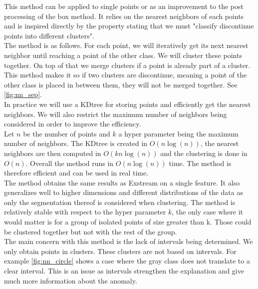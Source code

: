 \documentclass[oneside, a4paper, onecolumn, 11pt]{article}
\begin{document}
This method can be applied to single points or as an improvement to the post processing of the box method. It relies on the nearest neighbors of each points and is inspired directly by the property stating that we must "classify discontinue points into different clusters".\\
The method is as follows. For each point, we will iteratively get its next nearest neighbor until reaching a point of the other class. We will cluster these points together. On top of that we merge clusters if a point is already part of a cluster. This method makes it so if two clusters are discontinue, meaning a point of the other class is placed in between them, they will not be merged together. See \autoref{fig:nn_sep}.\\ 
In practice we will use a KDtree for storing points and efficiently get the nearest neighbors. We will also restrict the maximum number of neighbors being considered in order to improve the efficiency.\\
Let $n$ be the number of points and $k$  a hyper parameter being the maximum number of neighbors. The KDtree is created in $O(n \log(n))$, the nearest neighbors are then computed in $O(k n\log(n))$ and the clustering is done in $O(n)$. Overall the method runs in $O(n \log(n))$ time. The method is therefore efficient and can be used in real time.\\
The method obtains the same results as Exstream on a single feature. It also generalizes well to higher dimensions and different distributions of the data as only the segmentation thereof is considered when clustering. The method is relatively stable with respect to the hyper parameter $k$, the only case where it would matter is for a group of isolated points of size greater than k. Those could be clustered together but not with the rest of the group.\\
The main concern with this method is the lack of intervals being determined. We only obtain points in clusters. These clusters are not based on intervals. For example \autoref{fig:nn_circle} shows a case where the gray class does not translate to a clear interval. This is an issue as intervals strengthen the explanation and give much more information about the anomaly.
\end{document}
